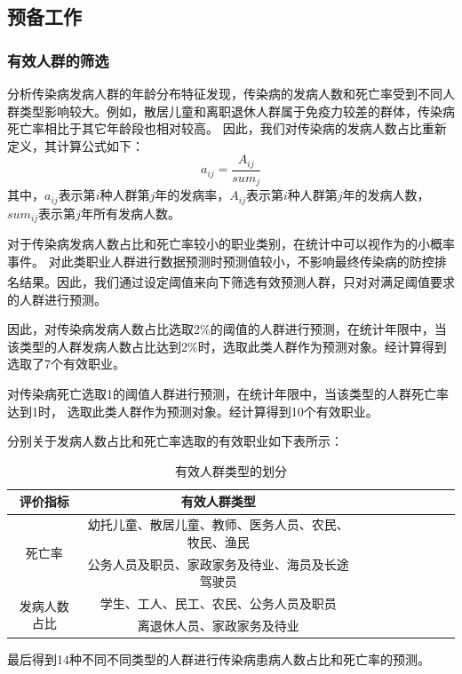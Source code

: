 \documentclass{whutmod}
\begin{document}
\subsection{预备工作}
\subsubsection{有效人群的筛选}
分析传染病发病人群的年龄分布特征发现，传染病的发病人数和死亡率受到不同人群类型影响较大。例如，散居儿童和离职退休人群属于免疫力较差的群体，传染病死亡率相比于其它年龄段也相对较高。
因此，我们对传染病的发病人数占比重新定义，其计算公式如下：
\begin{equation}
    a_{ij}=\frac{A_{ij}}{sum_j}
\end{equation}
其中，$a_{ij}$表示第$i$种人群第$j$年的发病率，$A_{ij}$表示第$i$种人群第$j$年的发病人数，$sum_{ij}$表示第$j$年所有发病人数。

对于传染病发病人数占比和死亡率较小的职业类别，在统计中可以视作为的小概率事件。
对此类职业人群进行数据预测时预测值较小，不影响最终传染病的防控排名结果。因此，我们通过设定阈值\textsuperscript{\cite{bib:four}}来向下筛选有效预测人群，只对对满足阈值要求的人群进行预测。

因此，对传染病发病人数占比选取2\%的阈值的人群进行预测，在统计年限中，当该类型的人群发病人数占比达到2\%时，选取此类人群作为预测对象。经计算得到选取了7个有效职业。

对传染病死亡选取1\textperthousand 的阈值人群进行预测，在统计年限中，当该类型的人群死亡率达到1\textperthousand 时，
选取此类人群作为预测对象。经计算得到10个有效职业。

分别关于发病人数占比和死亡率选取的有效职业如下表所示：
\begin{table}[H]
    \caption{有效人群类型的划分} \centering 
    \begin{tabular*}{14cm}{cccccccccc}
    \toprule[1.5pt]
    评价指标 & 有效人群类型 \\
    \midrule[1pt]
    \multirow{2}{*}{死亡率} & 幼托儿童、散居儿童、教师、医务人员、农民、牧民、渔民 \\
     & 公务人员及职员、家政家务及待业、海员及长途驾驶员 \\
     \hline
     \multirow{2}{*}{发病人数占比} & 学生、工人、民工、农民、公务人员及职员\\ 
      & 离退休人员、家政家务及待业 \\
    \bottomrule[1.5pt]
  \end{tabular*}
\end{table}
最后得到14种不同不同类型的人群进行传染病患病人数占比和死亡率的预测。
\end{document}
